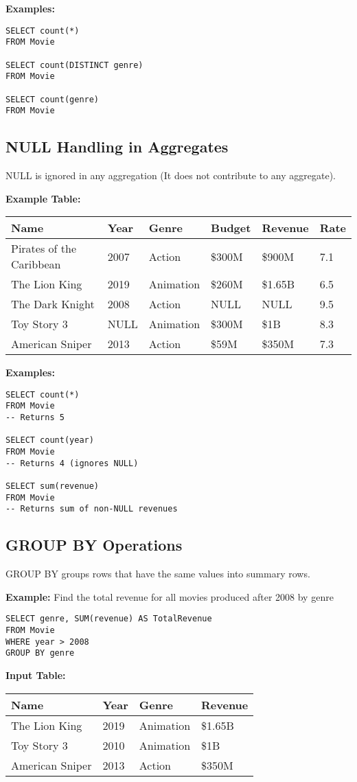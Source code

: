 \documentclass{article}
\begin{document}
\textbf{Examples:}
\begin{verbatim}
SELECT count(*)
FROM Movie

SELECT count(DISTINCT genre)
FROM Movie

SELECT count(genre)
FROM Movie
\end{verbatim}

\subsection*{NULL Handling in Aggregates}
NULL is ignored in any aggregation (It does not contribute to any aggregate).

\textbf{Example Table:}
\begin{tabular}{llllll}
\hline
Name & Year & Genre & Budget & Revenue & Rate \\
\hline
Pirates of the Caribbean & 2007 & Action & \$300M & \$900M & 7.1 \\
The Lion King & 2019 & Animation & \$260M & \$1.65B & 6.5 \\
The Dark Knight & 2008 & Action & NULL & NULL & 9.5 \\
Toy Story 3 & NULL & Animation & \$300M & \$1B & 8.3 \\
American Sniper & 2013 & Action & \$59M & \$350M & 7.3 \\
\hline
\end{tabular}

\textbf{Examples:}
\begin{verbatim}
SELECT count(*)
FROM Movie
-- Returns 5

SELECT count(year)
FROM Movie
-- Returns 4 (ignores NULL)

SELECT sum(revenue)
FROM Movie
-- Returns sum of non-NULL revenues
\end{verbatim}

\subsection*{GROUP BY Operations}
GROUP BY groups rows that have the same values into summary rows.

\textbf{Example:} Find the total revenue for all movies produced after 2008 by genre

\begin{verbatim}
SELECT genre, SUM(revenue) AS TotalRevenue
FROM Movie
WHERE year > 2008
GROUP BY genre
\end{verbatim}

\textbf{Input Table:}
\begin{tabular}{llll}
\hline
Name & Year & Genre & Revenue \\
\hline
The Lion King & 2019 & Animation & \$1.65B \\
Toy Story 3 & 2010 & Animation & \$1B \\
American Sniper & 2013 & Action & \$350M \\
\hline
\end{tabular}
\end{document}

